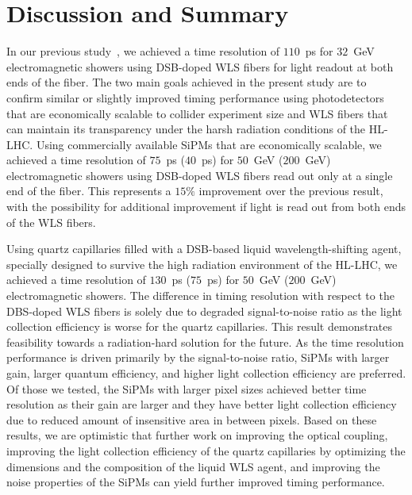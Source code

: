 \documentclass[preprint,1p]{elsarticle}
\begin{document}
  
%
%
  
%
%

\section{Discussion and Summary} 
In our previous study~\cite{Anderson:2015gha}, we achieved
a time resolution of $110$~ps for $32$~GeV electromagnetic showers using
DSB-doped WLS fibers for light readout at both ends of the fiber. The two main
goals achieved in the present study are to confirm similar or slightly improved
timing performance using photodetectors that are economically scalable to
collider experiment size and WLS fibers that can maintain its transparency under
the harsh radiation conditions of the HL-LHC. Using commercially available SiPMs
that are economically scalable, we achieved a time resolution of $75$~ps
($40$~ps) for $50$~GeV ($200$~GeV) electromagnetic showers using DSB-doped WLS
fibers read out only at a single end of the fiber. This represents a $15\%$
improvement over the previous result, with the possibility for additional
improvement if light is read out from both ends of the WLS fibers. 

Using quartz capillaries filled with a DSB-based liquid wavelength-shifting
agent, specially designed to survive the high radiation environment of the
HL-LHC, we achieved a time resolution of $130$~ps ($75$~ps) for $50$~GeV
($200$~GeV) electromagnetic showers. The difference in timing resolution with
respect to the DBS-doped WLS fibers is solely due to degraded signal-to-noise
ratio as the light collection efficiency is worse for the quartz capillaries.
This result demonstrates feasibility towards a radiation-hard solution for the
future. As the time resolution performance is driven primarily by the
signal-to-noise ratio, SiPMs with larger gain, larger quantum efficiency, and
higher light collection efficiency are preferred. Of those we tested, the SiPMs with
larger pixel sizes achieved better time resolution as their gain are larger
and they have better light collection efficiency due to reduced amount of 
insensitive area in between pixels. Based on these results, we are
optimistic that further work on improving the optical coupling, improving the
light collection efficiency of the quartz capillaries by optimizing the
dimensions and the composition of the liquid WLS agent, and improving the noise
properties of the SiPMs can yield further improved timing performance. 

  
%
%
\end{document}
